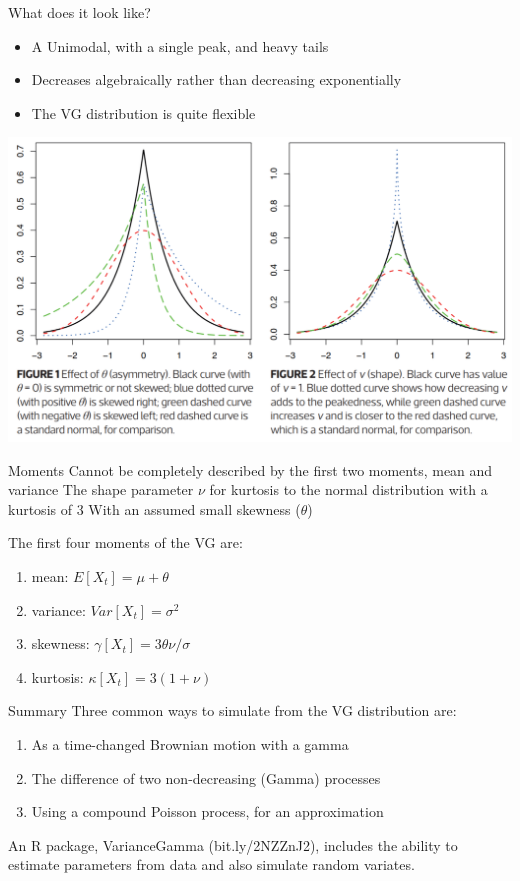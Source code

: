 \documentclass[
  ignorenonframetext,
]{beamer}
\providecommand{\tightlist}{%
  \setlength{\itemsep}{0pt}\setlength{\parskip}{0pt}}
\begin{document}
\begin{frame}{What does it look like?}
\begin{itemize}
\tightlist
\item
  A Unimodal, with a single peak, and heavy tails
\item
  Decreases algebraically rather than decreasing exponentially
\item
  The VG distribution is quite flexible
\end{itemize}

\begin{center}\includegraphics[width=0.7\linewidth]{figure/vg_1} \end{center}
\end{frame}

\begin{frame}{Moments}
\protect\hypertarget{moments}{}
Cannot be completely described by the first two moments, mean and
variance The shape parameter \(\nu\) for kurtosis to the normal
distribution with a kurtosis of 3 With an assumed small skewness
(\(\theta\))

The first four moments of the VG are:

\begin{enumerate}
\tightlist
\item
  mean: \(E[X_t] = \mu + \theta\)
\item
  variance: \(Var[X_t] = \sigma^2\)
\item
  skewness: \(\gamma[X_t] = 3\theta\nu/\sigma\)
\item
  kurtosis: \(\kappa[X_t] = 3(1 + \nu)\)
\end{enumerate}
\end{frame}

\begin{frame}{Summary}
\protect\hypertarget{summary}{}
Three common ways to simulate from the VG distribution are:

\begin{enumerate}
\item
  As a time-changed Brownian motion with a gamma
\item
  The difference of two non-decreasing (Gamma) processes
\item
  Using a compound Poisson process, for an approximation
\end{enumerate}

An R package, VarianceGamma (bit.ly/2NZZnJ2), includes the ability to
estimate parameters from data and also simulate random variates.
\end{frame}
\end{document}
